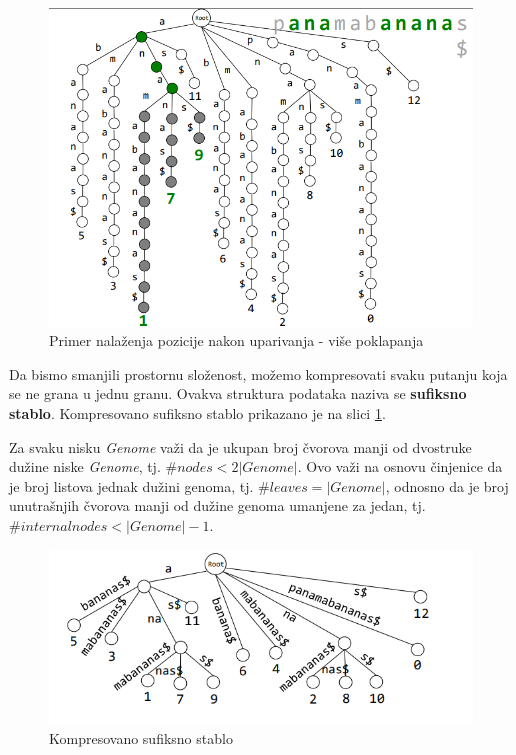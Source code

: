 \begin{figure}[h!]
\centering
\includegraphics[scale=0.5]{poglavlja/9/slike/sufiksnoStabloNaciIndeksPocetkaVise.png}
\caption{Primer nalaženja pozicije nakon uparivanja - više poklapanja}
\end{figure}
\fi 


Da bismo smanjili prostornu složenost, možemo kompresovati svaku putanju koja se ne grana u jednu granu. Ovakva struktura podataka naziva se \textbf{sufiksno stablo}. Kompresovano sufiksno stablo prikazano je na slici \ref{kss}.

Za svaku nisku \textit{Genome} važi da je ukupan broj čvorova manji od dvostruke dužine niske \textit{Genome}, tj. $\# nodes < 2|Genome|$. Ovo važi na osnovu činjenice da je broj listova jednak dužini genoma, tj. $\# leaves = |Genome|$, odnosno da je broj unutrašnjih čvorova manji od dužine genoma umanjene za jedan, tj. $\# internal nodes < |Genome| - 1$.

\begin{figure}[h!]
\centering
\includegraphics[scale=0.5]{poglavlja/9/slike/sufiksnoStabloKompresovano.png}
\caption{Kompresovano sufiksno stablo}
\label{kss}
\end{figure}

